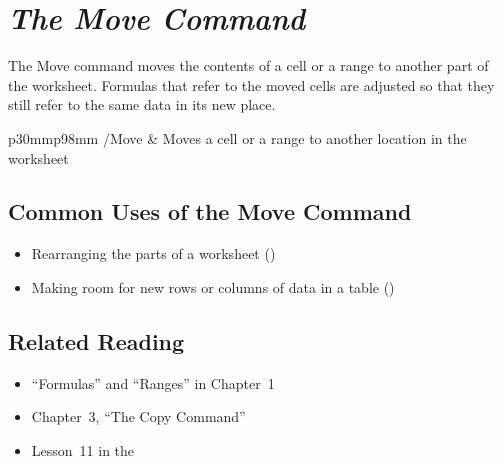\chapter[The Move Command]{\textit{The Move Command}}


The Move command moves the contents of a cell or a range to another part of
the worksheet.  Formulas that refer to the moved cells are adjusted so that
they still refer to the same data in its new place.

\begin{LotTable}{p{30mm}p{98mm}}
/Move & Moves a cell or a range to another location in the worksheet\LotEnd
\end{LotTable}

\section{Common Uses of the Move Command}
\begin{itemize}
\item Rearranging the parts of a worksheet ()
\item Making room for new rows or columns of data in a table
  ()
\end{itemize}

\section{Related Reading}
\begin{itemize}
\item ``Formulas'' and ``Ranges'' in Chapter~1
\item Chapter~3, ``The Copy Command''
\item Lesson~11 in the 
\end{itemize}

